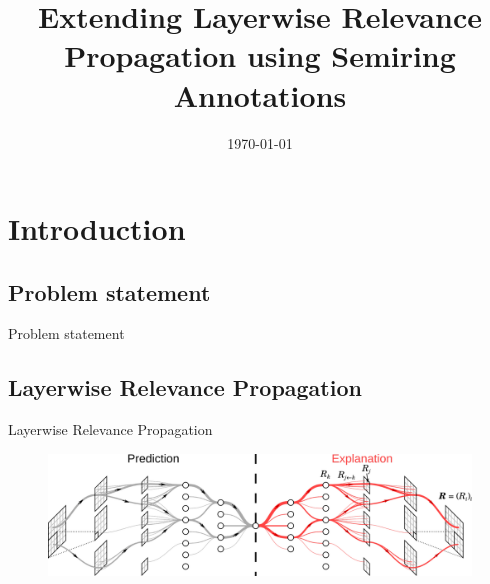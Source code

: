 \documentclass[aspectratio=169]{beamer}
\title{\textbf{Extending Layerwise Relevance Propagation using Semiring Annotations}}
\author{%
  \texorpdfstring{%
    \begin{columns}
      \column{.5\linewidth}
      \centering
      \textbf{Antoine Groudiev} \\ L3, ENS Ulm
      \column{.5\linewidth}
      \centering
      \textbf{Silviu Maniu} -- Supervisor \\ SLIDE Team, LIG
    \end{columns}
 }
 {Antoine Groudiev, Silviu Maniu}
}
\date{\today}
\theoremstyle{definition}
\begin{document}
\frame{\titlepage}


\section{Introduction}
\subsection{Problem statement}
\begin{frame}{Problem statement}
    \begin{figure}
        \centering
    \end{figure}
\end{frame}

\subsection{Layerwise Relevance Propagation}
\begin{frame}{Layerwise Relevance Propagation \cite{montavon-lrp}}
    \begin{figure}[H]
        \includegraphics[width=\textwidth]{LRP.png}
    \end{figure}
\end{frame}
\end{document}
